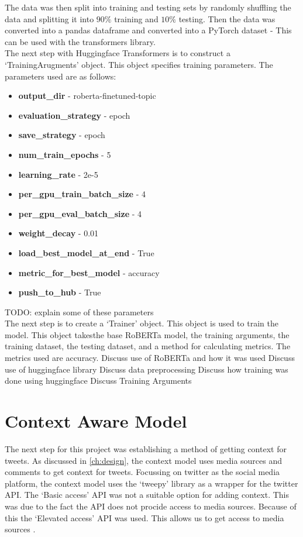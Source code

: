 The data was then split into training and testing sets by randomly shuffling the data and splitting it into $90\%$ training and $10\%$ testing.
Then the data was converted into a pandas dataframe and converted into a PyTorch dataset - This can be used with the transformers library.\\
The next step with Huggingface Transformers is to construct a `TrainingArugments' object. This object specifies training parameters. The parameters
used are as follows:
\begin{itemize}
    \item \textbf{output\_dir} - roberta-finetuned-topic
    \item \textbf{evaluation\_strategy} - epoch
    \item \textbf{save\_strategy} - epoch
    \item \textbf{num\_train\_epochs} - 5
    \item \textbf{learning\_rate} - 2e-5
    \item \textbf{per\_gpu\_train\_batch\_size} - 4
    \item \textbf{per\_gpu\_eval\_batch\_size} - 4
    \item \textbf{weight\_decay} - 0.01
    \item \textbf{load\_best\_model\_at\_end} - True
    \item \textbf{metric\_for\_best\_model} - accuracy
    \item \textbf{push\_to\_hub} - True
\end{itemize}

TODO: explain some of these parameters\\
The next step is to create a `Trainer' object. This object is used to train the model. This object takesthe base RoBERTa model, the training arguments,
the training dataset, the testing dataset, and a method for calculating metrics. The metrics used are accuracy. 
Discuss use of RoBERTa and how it was used
Discuss use of huggingface library
Discuss data preprocessing
Discuss how training was done using huggingface
Discuss Training Arguments
\section{Context Aware Model}
The next step for this project was establishing a method of getting context for tweets. As discussed in \cref{ch:design}, the context model uses
media sources and comments to get context for tweets. Focussing on twitter as the social media platform, the context model uses the `tweepy' library
as a wrapper for the twitter API. The `Basic access' API was not a suitable option for adding context. This was due to the fact the API does not
procide access to media sources. Because of this the `Elevated access' API was used. This allows us to get access to media sources \cite{twitter_developer_nodate}.
